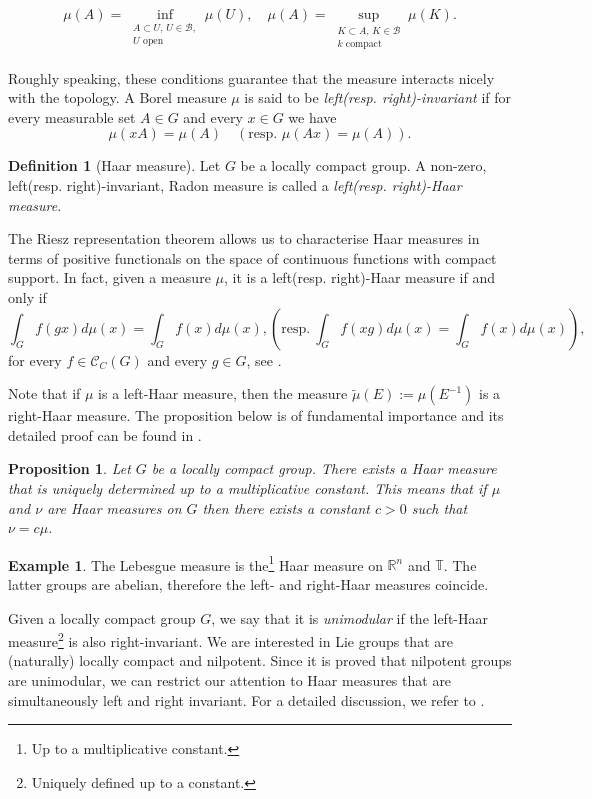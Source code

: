 \documentclass[12pt,oneside,a4paper]{book}
\numberwithin{equation}{section}     %
\theoremstyle{plain}
\newtheorem{proposition}[theorem]{Proposition}
\theoremstyle{definition}
\newtheorem{definition}[theorem]{Definition}
\newtheorem{example}[theorem]{Example}
\newcommand{\R}{{\mathbb R}}
\newcommand{\Rn}{{\R}^n}
\begin{document}
\begin{align*}
\mu(A)=\inf_{\substack{A\subset U,\,U\in\mathcal{B}, \\ U \text{ open}}}\mu(U),\quad \mu(A)=\sup_{\substack{{K\subset A,\,K\in\mathcal{B}}\\ k\text{ compact}}}\mu(K).
\end{align*}

Roughly speaking, these conditions guarantee that the measure interacts nicely with the topology. A Borel measure $\mu$ is said to be \textit{left(resp. right)-invariant} if for every measurable set $A\in G$ and every $x\in G$ we have
\[
\mu(xA)=\mu(A)\quad(\text{resp. }\mu(Ax)=\mu(A)).
\]

\begin{definition}[Haar measure]\label{DEF:haar}
	Let $G$ be a locally compact group. A non-zero, left(resp. right)-invariant, Radon measure is called a \textit{left(resp. right)-Haar measure}.
\end{definition}

The Riesz representation theorem allows us to characterise Haar measures in terms of positive functionals on the space of continuous functions with compact support. In fact, given a measure $\mu$, it is a left(resp. right)-Haar measure if and only if
\[
\int_Gf(gx)d\mu(x)=\int_Gf(x)d\mu(x),
\left(\text{resp.}~\int_Gf(xg)d\mu(x)=\int_Gf(x)d\mu(x)\right),
\] 
for every $f\in\mathcal{C}_C(G)$ and every $g\in G$, see \cite[Proposition 11.4]{F2013}.

Note that if $\mu$ is a left-Haar measure, then the measure $\tilde{\mu}(E):=\mu(E^{-1})$ is a right-Haar measure. The proposition below is of fundamental importance and its detailed proof can be found in \cite{F1994,DE2009,F2013,R2014}. 

\begin{proposition}
	Let $G$ be a locally compact group. There exists a Haar measure that is uniquely determined up to a multiplicative constant. This means that if $\mu$ and $\nu$ are Haar measures on $G$ then there exists a constant $c>0$ such that $\nu=c\mu$.
\end{proposition}

\begin{example}
	The Lebesgue measure is the\footnote{Up to a multiplicative constant.} Haar measure on $\Rn$ and $\mathbb{T}$. The latter groups are abelian, therefore the left- and right-Haar measures coincide.
\end{example}

Given a locally compact group $G$, we say that it is \textit{unimodular} if the left-Haar measure\footnote{Uniquely defined up to a constant.} is also right-invariant. We are interested in Lie groups that are (naturally) locally compact and nilpotent. Since it is proved that nilpotent groups are unimodular, we can restrict our attention to Haar measures that are simultaneously left and right invariant. For a detailed discussion, we refer to \cite{R2014}.
\end{document}
